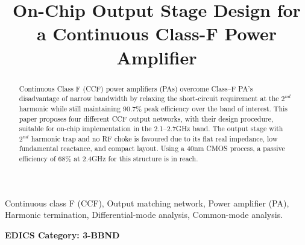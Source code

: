 \documentclass[conference]{IEEEtran}
\begin{document}
\title{On-Chip Output Stage Design for a  Continuous Class-F Power Amplifier}

\author{ 
}

\maketitle

\begin{abstract}
Continuous Class F (CCF) power amplifiers (PAs) overcome Class--F PA's disadvantage of narrow bandwidth by relaxing the short-circuit requirement at the $2^{nd}$ harmonic while still maintaining 90.7\% peak efficiency over the band of interest. This paper proposes four different CCF output networks, with their design procedure, suitable for on-chip implementation in the 2.1--2.7GHz band. The output stage with $2^{nd}$ harmonic trap and no RF choke is favoured due to its flat real impedance, low fundamental reactance, and compact layout. Using a 40nm CMOS process, a passive efficiency of 68\% at 2.4GHz for this structure is in reach.
\end{abstract}

\vspace{1mm}
\begin{IEEEkeywords}
Continuous class F (CCF), Output matching network, Power amplifier (PA), Harmonic termination, Differential-mode analysis, Common-mode analysis. 
\end{IEEEkeywords}


\ifCLASSOPTIONpeerreview
\begin{center} \bfseries EDICS Category: 3-BBND \end{center}
\fi

\IEEEpeerreviewmaketitle
\end{document}
